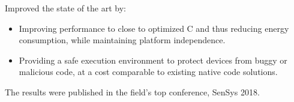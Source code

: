\documentclass[10pt,a4paper]{../altacv}
\begin{document}
Improved the state of the art by:

\medskip

\begin{itemize}
	\item\small{Improving performance to close to optimized C and thus reducing energy consumption, while maintaining platform independence.}
	\item\small{Providing a safe execution environment to protect devices from buggy or malicious code, at a cost comparable to existing native code solutions.}
\end{itemize}

\medskip

The results were published in the field's top conference, SenSys 2018.

\medskip


\medskip
\end{document}
